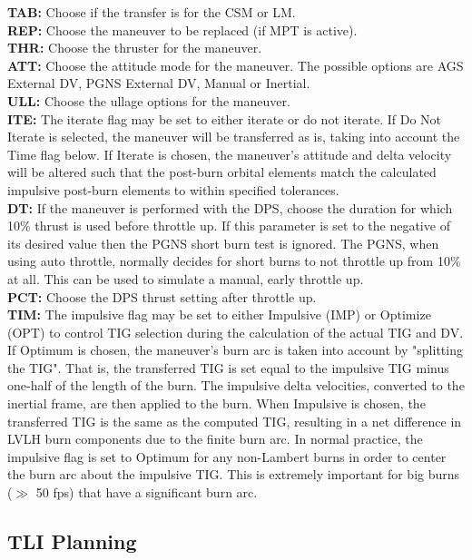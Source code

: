 \documentclass[11pt]{article} %
\begin{document}
\textbf{TAB:} Choose if the transfer is for the CSM or LM.\\
\textbf{REP:} Choose the maneuver to be replaced (if MPT is active).\\
\textbf{THR:} Choose the thruster for the maneuver.\\
\textbf{ATT:} Choose the attitude mode for the maneuver. The possible options are AGS External DV, PGNS External DV, Manual or Inertial.\\
\textbf{ULL:} Choose the ullage options for the maneuver.\\
\textbf{ITE:} The iterate flag may be set to either iterate or do not iterate. If Do Not Iterate is selected, the maneuver will be transferred as is, taking into account the Time flag below. If Iterate is chosen, the maneuver's attitude and delta velocity will be altered such that the post-burn orbital elements match the calculated impulsive post-burn elements to within specified tolerances.\\
\textbf{DT:} If the maneuver is performed with the DPS, choose the duration for which 10\% thrust is used before throttle up. If this parameter is set to the negative of its desired value then the PGNS short burn test is ignored. The PGNS, when using auto throttle, normally decides for short burns to not throttle up from 10\% at all. This can be used to simulate a manual, early throttle up.\\
\textbf{PCT:} Choose the DPS thrust setting after throttle up.\\
\textbf{TIM:} The impulsive flag may be set to either Impulsive (IMP) or Optimize (OPT) to control TIG selection during the calculation of the actual TIG and DV. If Optimum is chosen, the maneuver's burn arc is taken into account by "splitting the TIG". That is, the transferred TIG is set equal to the impulsive TIG minus one-half of the length of the burn. The impulsive delta velocities, converted to the inertial frame, are then applied to the burn. When Impulsive is chosen, the transferred TIG is the same as the computed TIG, resulting in a net difference in LVLH burn components due to the finite burn arc. In normal practice, the impulsive flag is set to Optimum for any non-Lambert burns in order to center the burn arc about the impulsive TIG. This is extremely important for big burns ($\gg$ 50 fps) that have a significant burn arc.\\
\newpage
\subsection{TLI Planning}
\end{document}
